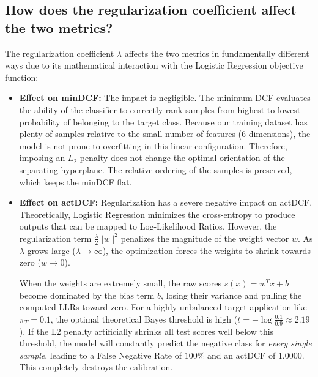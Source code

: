 \subsection*{How does the regularization coefficient affect the two metrics?}
The regularization coefficient $\lambda$ affects the two metrics in fundamentally different ways due to its mathematical interaction with the Logistic Regression objective function:
\begin{itemize}
    \item \textbf{Effect on minDCF:} The impact is negligible. The minimum DCF evaluates the ability of the classifier to correctly rank samples from highest to lowest probability of belonging to the target class. Because our training dataset has plenty of samples relative to the small number of features (6 dimensions), the model is not prone to overfitting in this linear configuration. Therefore, imposing an $L_2$ penalty does not change the optimal orientation of the separating hyperplane. The relative ordering of the samples is preserved, which keeps the minDCF flat.
    
    \item \textbf{Effect on actDCF:} Regularization has a severe negative impact on actDCF. Theoretically, Logistic Regression minimizes the cross-entropy to produce outputs that can be mapped to Log-Likelihood Ratios. However, the regularization term $\frac{\lambda}{2} ||w||^2$ penalizes the magnitude of the weight vector $w$. As $\lambda$ grows large ($\lambda \to \infty$), the optimization forces the weights to shrink towards zero ($w \to 0$). 
    
    When the weights are extremely small, the raw scores $s(x) = w^T x + b$ become dominated by the bias term $b$, losing their variance and pulling the computed LLRs toward zero. For a highly unbalanced target application like $\pi_T = 0.1$, the optimal theoretical Bayes threshold is high ($t = -\log \frac{0.1}{0.9} \approx 2.19$). If the L2 penalty artificially shrinks all test scores well below this threshold, the model will constantly predict the negative class for \textit{every single sample}, leading to a False Negative Rate of $100\%$ and an actDCF of $1.0000$. This completely destroys the calibration.
\end{itemize}
